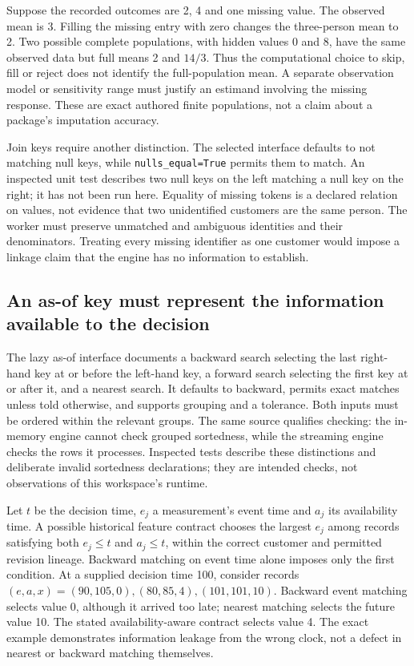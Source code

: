 Suppose the recorded outcomes are 2, 4 and one missing value. The observed
mean is 3. Filling the missing entry with zero changes the three-person
mean to 2. Two possible complete populations, with hidden values 0 and 8,
have the same observed data but full means 2 and $14/3$. Thus the
computational choice to skip, fill or reject does not identify the
full-population mean. A separate observation model or sensitivity range
must justify an estimand involving the missing response. These are exact
authored finite populations, not a claim about a package's imputation
accuracy.~\citep{exec23_polars_reference}

Join keys require another distinction. The selected interface defaults to
not matching null keys, while \texttt{nulls\_equal=True} permits them to
match. An inspected unit test describes two null keys on the left matching
a null key on the right; it has not been run here. Equality of missing
tokens is a declared relation on values, not evidence that two unidentified
customers are the same person. The worker must preserve unmatched and
ambiguous identities and their denominators. Treating every missing
identifier as one customer would impose a linkage claim that the engine
has no information to establish.~\citep{exec23_polars_sources}

\subsection{An as-of key must represent the information available to the decision}

The lazy as-of interface documents a backward search selecting the last
right-hand key at or before the left-hand key, a forward search selecting
the first key at or after it, and a nearest search. It defaults to
backward, permits exact matches unless told otherwise, and supports
grouping and a tolerance. Both inputs must be ordered within the relevant
groups. The same source qualifies checking: the in-memory engine cannot
check grouped sortedness, while the streaming engine checks the rows it
processes. Inspected tests describe these distinctions and deliberate
invalid sortedness declarations; they are intended checks, not observations
of this workspace's runtime.~\citep{exec23_polars_sources}

Let $t$ be the decision time, $e_j$ a measurement's event time and $a_j$
its availability time. A possible historical feature contract chooses
the largest $e_j$ among records satisfying both $e_j\leq t$ and
$a_j\leq t$, within the correct customer and permitted revision lineage.
Backward matching on event time alone imposes only the first condition.
At a supplied decision time 100, consider records
$(e,a,x)=(90,105,0),(80,85,4),(101,101,10)$. Backward event matching
selects value 0, although it arrived too late; nearest matching selects
the future value 10. The stated availability-aware contract selects value
4. The exact example demonstrates information leakage from the wrong
clock, not a defect in nearest or backward matching themselves.
\citep{exec23_polars_reference}

